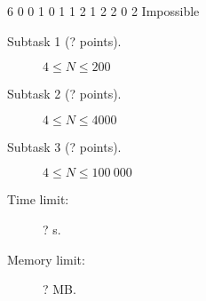 \documentclass{boi2014}
\begin{document}
	\example
	{
		6
		0 0
		1 0
		1 1
		2 1
		2 2
		0 2
	}
	{
		Impossible
	}

    \Scoring

    \begin{description}
        \item[Subtask 1 (? points).] $4 \le N \le 200$
        \item[Subtask 2 (? points).] $4 \le N \le 4000$
        \item[Subtask 3 (? points).] $4 \le N \le 100\ 000$
    \end{description}

    \Constraints

    \begin{description}
        \item[Time limit:] ? s.
        \item[Memory limit:] ? MB.
    \end{description}
\end{document}
